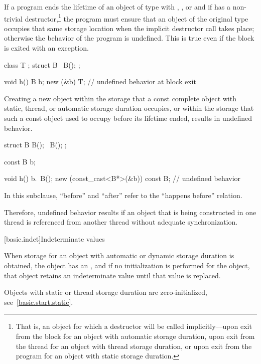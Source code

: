 \pnum
If a program ends the lifetime of an object of type  with
, ,
or 
and if  has a non-trivial destructor,\footnote{That
is, an object for which a destructor will be called
implicitly---upon exit from the block for an object with
automatic storage duration, upon exit from the thread for an object with
thread storage duration, or upon exit from the program for an object
with static storage duration.}
the program must ensure that an object of the original type occupies
that same storage location when the implicit destructor call takes
place; otherwise the behavior of the program is undefined. This is true
even if the block is exited with an exception.
\begin{example}
\begin{codeblock}
class T { };
struct B {
   ~B();
};

void h() {
   B b;
   new (&b) T;
}                               // undefined behavior at block exit
\end{codeblock}
\end{example}

\pnum
Creating a new object within the storage that a const complete
object with static, thread, or automatic storage duration occupies,
or within the storage that such a const object used to occupy before
its lifetime ended, results in undefined behavior.
\begin{example}
\begin{codeblock}
struct B {
  B();
  ~B();
};

const B b;

void h() {
  b.~B();
  new (const_cast<B*>(&b)) const B;     // undefined behavior
}
\end{codeblock}
\end{example}

\pnum
In this subclause, ``before'' and ``after'' refer to the ``happens before''
relation.
\begin{note}
Therefore, undefined behavior results
if an object that is being constructed in one thread is referenced from another
thread without adequate synchronization.
\end{note}

[basic.indet]{Indeterminate values}

\pnum
{}%
%
When storage for an object with automatic or dynamic storage duration
is obtained, the object has an , and if
no initialization is performed for the object, that object retains an
indeterminate value until that value is replaced.
\begin{note}
Objects with static or thread storage duration are zero-initialized,
see~\ref{basic.start.static}.
\end{note}

